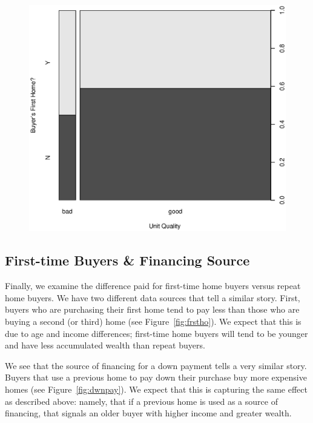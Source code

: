 \documentclass[11pt, fleqn]{article}
\begin{document}
\begin{figure}[!htb]
  \centering
  \includegraphics[scale=.5]{first_home_vs_home_quality.eps}
  \caption{}
  \label{fig:first_qual}
\end{figure}

\subsection{First-time Buyers \& Financing Source}

Finally, we examine the difference paid for first-time home buyers versus repeat home buyers. We have two different data sources that tell a similar story. First, buyers who are purchasing their first home tend to pay less than those who are buying a second (or third) home (see Figure~\vref{fig:frstho}). We expect that this is due to age and income differences; first-time home buyers will tend to be younger and have less accumulated wealth than repeat buyers. 

We see that the source of financing for a down payment tells a very similar story. Buyers that use a previous home to pay down their purchase buy more expensive homes (see Figure~\vref{fig:dwnpay}). We expect that this is capturing the same effect as described above: namely, that if a previous home is used as a source of financing, that signals an older buyer with higher income and greater wealth.
\end{document}
